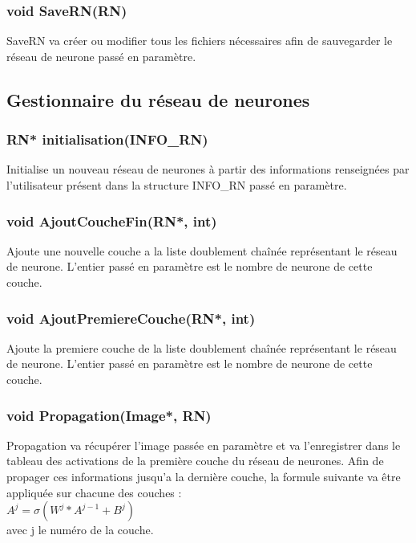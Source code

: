 \documentclass{article}
\begin{document}
		\subsubsection{\textcolor{myblue}{\textbf{void}} SaveRN(\textcolor{myblue}{\textbf{RN}})}
		SaveRN va créer ou modifier tous les fichiers nécessaires afin de sauvegarder le réseau de neurone passé en paramètre.
		
	
	\subsection{Gestionnaire du réseau de neurones}
		\subsubsection{\textcolor{myblue}{\textbf{RN*}} initialisation(\textcolor{myblue}{\textbf{INFO\_RN}})}
		Initialise un nouveau réseau de neurones à partir des informations renseignées par l'utilisateur présent dans la structure INFO\_RN passé en paramètre.
		
		\subsubsection{\textcolor{myblue}{\textbf{void}} AjoutCoucheFin(\textcolor{myblue}{\textbf{RN*}}, \textcolor{myblue}{\textbf{int}})}
		Ajoute une nouvelle couche a la liste doublement chaînée représentant le réseau de neurone. L'entier passé en paramètre est le nombre de neurone de cette couche.
		
		\subsubsection{\textcolor{myblue}{\textbf{void}} AjoutPremiereCouche(\textcolor{myblue}{\textbf{RN*}}, \textcolor{myblue}{\textbf{int}})}
		Ajoute la premiere couche de la liste doublement chaînée représentant le réseau de neurone. L'entier passé en paramètre est le nombre de neurone de cette couche.
		
		\subsubsection{\textcolor{myblue}{\textbf{void}} Propagation(\textcolor{myblue}{\textbf{Image*}}, \textcolor{myblue}{\textbf{RN}})}
		Propagation va récupérer l'image passée en paramètre et va l'enregistrer dans le tableau des activations de la première couche du réseau de neurones. Afin de propager ces informations jusqu'a la dernière couche, la formule suivante va être appliquée sur chacune des couches :\\ $A^j = \sigma(W^j*A^{j-1}+B^j)$\\
		avec j le numéro de la couche.
		
\end{document}
